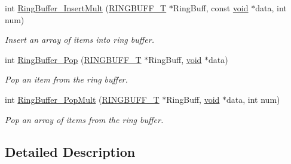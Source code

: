 \begin{DoxyCompactItemize}
int \hyperlink{group__Ring__Buffer_gafeafb521d4e03052ab2c893fd0e388d5}{Ring\-Buffer\-\_\-\-Insert\-Mult} (\hyperlink{structRINGBUFF__T}{R\-I\-N\-G\-B\-U\-F\-F\-\_\-\-T} $\ast$Ring\-Buff, const \hyperlink{Paradigm_2Tern__EE_2small_2portmacro_8h_a14d32f8130d3c0b212cfc751730b5b49}{void} $\ast$data, int num)
\begin{DoxyCompactList}\small\item\em Insert an array of items into ring buffer. \end{DoxyCompactList}\item 
int \hyperlink{group__Ring__Buffer_gaf3ce7f43677c2b4c6eedb3cc4962b80d}{Ring\-Buffer\-\_\-\-Pop} (\hyperlink{structRINGBUFF__T}{R\-I\-N\-G\-B\-U\-F\-F\-\_\-\-T} $\ast$Ring\-Buff, \hyperlink{Paradigm_2Tern__EE_2small_2portmacro_8h_a14d32f8130d3c0b212cfc751730b5b49}{void} $\ast$data)
\begin{DoxyCompactList}\small\item\em Pop an item from the ring buffer. \end{DoxyCompactList}\item 
int \hyperlink{group__Ring__Buffer_gae0ef7bb96d1fe84ae1441b7c214b1e56}{Ring\-Buffer\-\_\-\-Pop\-Mult} (\hyperlink{structRINGBUFF__T}{R\-I\-N\-G\-B\-U\-F\-F\-\_\-\-T} $\ast$Ring\-Buff, \hyperlink{Paradigm_2Tern__EE_2small_2portmacro_8h_a14d32f8130d3c0b212cfc751730b5b49}{void} $\ast$data, int num)
\begin{DoxyCompactList}\small\item\em Pop an array of items from the ring buffer. \end{DoxyCompactList}\end{DoxyCompactItemize}


\subsection{Detailed Description}


